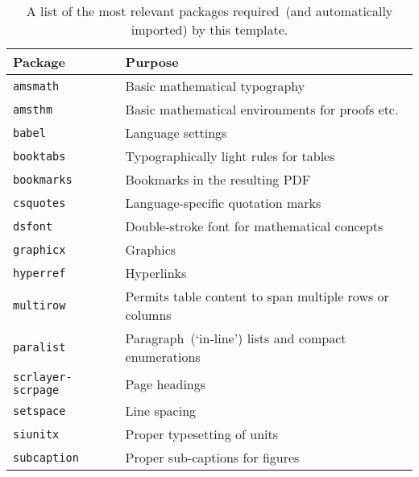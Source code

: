 \begin{table}
	\centering
	\begin{tabular}{ll}
		\toprule
		\textbf{Package}          & \textbf{Purpose}                                       \\
		\midrule
		\texttt{amsmath}          & Basic mathematical typography                          \\
		\texttt{amsthm}           & Basic mathematical environments for proofs etc.        \\
		\texttt{babel}            & Language settings                                      \\
		\texttt{booktabs}         & Typographically light rules for tables                 \\
		\texttt{bookmarks}        & Bookmarks in the resulting PDF                         \\
		\texttt{csquotes}         & Language-specific quotation marks                      \\
		\texttt{dsfont}           & Double-stroke font for mathematical concepts           \\
		\texttt{graphicx}         & Graphics                                               \\
		\texttt{hyperref}         & Hyperlinks                                             \\
		\texttt{multirow}         & Permits table content to span multiple rows or columns \\
		\texttt{paralist}         & Paragraph~(`in-line') lists and compact enumerations   \\
		\texttt{scrlayer-scrpage} & Page headings                                          \\
		\texttt{setspace}         & Line spacing                                           \\
		\texttt{siunitx}          & Proper typesetting of units                            \\
		\texttt{subcaption}       & Proper sub-captions for figures                        \\
		\bottomrule
	\end{tabular}
	\caption{%
		A list of the most relevant packages required~(and automatically imported) by this template.
	}
	\label{tab:Packages}
\end{table}


